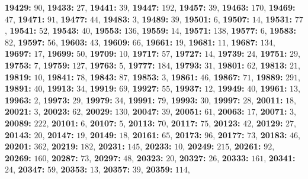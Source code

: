 \textsf{\bfseries 19429:} $90$, \textsf{\bfseries 19433:} $27$, \textsf{\bfseries 19441:} $39$, \textsf{\bfseries 19447:} $192$, \textsf{\bfseries 19457:} $39$, \textsf{\bfseries 19463:} $170$, \textsf{\bfseries 19469:} $47$, \textsf{\bfseries 19471:} $91$, \textsf{\bfseries 19477:} $44$, \textsf{\bfseries 19483:} $3$, \textsf{\bfseries 19489:} $39$, \textsf{\bfseries 19501:} $6$, \textsf{\bfseries 19507:} $14$, \textsf{\bfseries 19531:} $77$, \textsf{\bfseries 19541:} $52$, \textsf{\bfseries 19543:} $40$, \textsf{\bfseries 19553:} $136$, \textsf{\bfseries 19559:} $14$, \textsf{\bfseries 19571:} $138$, \textsf{\bfseries 19577:} $6$, \textsf{\bfseries 19583:} $82$, \textsf{\bfseries 19597:} $56$, \textsf{\bfseries 19603:} $43$, \textsf{\bfseries 19609:} $66$, \textsf{\bfseries 19661:} $19$, \textsf{\bfseries 19681:} $11$, \textsf{\bfseries 19687:} $134$, \textsf{\bfseries 19697:} $17$, \textsf{\bfseries 19699:} $50$, \textsf{\bfseries 19709:} $10$, \textsf{\bfseries 19717:} $57$, \textsf{\bfseries 19727:} $14$, \textsf{\bfseries 19739:} $24$, \textsf{\bfseries 19751:} $29$, \textsf{\bfseries 19753:} $7$, \textsf{\bfseries 19759:} $127$, \textsf{\bfseries 19763:} $5$, \textsf{\bfseries 19777:} $184$, \textsf{\bfseries 19793:} $31$, \textsf{\bfseries 19801:} $62$, \textsf{\bfseries 19813:} $21$, \textsf{\bfseries 19819:} $10$, \textsf{\bfseries 19841:} $78$, \textsf{\bfseries 19843:} $87$, \textsf{\bfseries 19853:} $3$, \textsf{\bfseries 19861:} $46$, \textsf{\bfseries 19867:} $71$, \textsf{\bfseries 19889:} $291$, \textsf{\bfseries 19891:} $40$, \textsf{\bfseries 19913:} $34$, \textsf{\bfseries 19919:} $69$, \textsf{\bfseries 19927:} $55$, \textsf{\bfseries 19937:} $12$, \textsf{\bfseries 19949:} $40$, \textsf{\bfseries 19961:} $13$, \textsf{\bfseries 19963:} $2$, \textsf{\bfseries 19973:} $29$, \textsf{\bfseries 19979:} $34$, \textsf{\bfseries 19991:} $79$, \textsf{\bfseries 19993:} $30$, \textsf{\bfseries 19997:} $28$, \textsf{\bfseries 20011:} $18$, \textsf{\bfseries 20021:} $3$, \textsf{\bfseries 20023:} $62$, \textsf{\bfseries 20029:} $130$, \textsf{\bfseries 20047:} $39$, \textsf{\bfseries 20051:} $61$, \textsf{\bfseries 20063:} $17$, \textsf{\bfseries 20071:} $3$, \textsf{\bfseries 20089:} $222$, \textsf{\bfseries 20101:} $6$, \textsf{\bfseries 20107:} $5$, \textsf{\bfseries 20113:} $70$, \textsf{\bfseries 20117:} $75$, \textsf{\bfseries 20123:} $42$, \textsf{\bfseries 20129:} $27$, \textsf{\bfseries 20143:} $20$, \textsf{\bfseries 20147:} $19$, \textsf{\bfseries 20149:} $18$, \textsf{\bfseries 20161:} $65$, \textsf{\bfseries 20173:} $96$, \textsf{\bfseries 20177:} $73$, \textsf{\bfseries 20183:} $46$, \textsf{\bfseries 20201:} $362$, \textsf{\bfseries 20219:} $182$, \textsf{\bfseries 20231:} $145$, \textsf{\bfseries 20233:} $10$, \textsf{\bfseries 20249:} $215$, \textsf{\bfseries 20261:} $92$, \textsf{\bfseries 20269:} $160$, \textsf{\bfseries 20287:} $73$, \textsf{\bfseries 20297:} $48$, \textsf{\bfseries 20323:} $20$, \textsf{\bfseries 20327:} $26$, \textsf{\bfseries 20333:} $161$, \textsf{\bfseries 20341:} $24$, \textsf{\bfseries 20347:} $59$, \textsf{\bfseries 20353:} $13$, \textsf{\bfseries 20357:} $39$, \textsf{\bfseries 20359:} $114$, 
